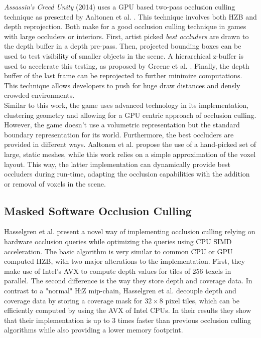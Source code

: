 \noindent
\emph{Assassin's Creed Unity} (2014) uses a \ac{GPU} based two-pass occlusion culling technique as presented by 
Aaltonen et al. \cite{Aaltonen2015}. This technique involves both \ac{HZB} and depth reprojection. Both make for 
a good occlusion culling technique in games with large occluders or interiors. First, artist picked 
\emph{best occluders} are drawn to the depth buffer in a depth pre-pass. Then, projected bounding boxes can be 
used to test visibility of smaller objects in the scene. A hierarchical z-buffer is used to accelerate this testing,
as proposed by Greene et al. \cite{Greene93,Greene95}. Finally, the depth buffer of the last frame can be 
reprojected to further minimize computations. This technique allows developers to push for huge draw distances and 
densly crowded environments.\\

\noindent
Similar to this work, the game uses advanced technology in its implementation, clustering geometry and allowing 
for a \ac{GPU} centric approach of occlusion culling. However, the game doesn't use a volumetric representation 
but the standard boundary representation for its world. Furthermore, the best occluders are provided in different 
ways. Aaltonen et al. \cite{Aaltonen2015} propose the use of a hand-picked set of large, static meshes, while this 
work relies on a simple approximation of the voxel layout. This way, the latter implementation can dynamically 
provide best occluders during run-time, adapting the occlusion capabilities with the addition or removal of voxels 
in the scene.


\subsection*{Masked Software Occlusion Culling}

Hasselgren et al. \cite{Hasselgren2016} present a novel way of implementing occlusion culling relying on hardware 
occlusion queries while optimizing the queries using \ac{CPU} \ac{SIMD} acceleration. The basic algorithm is very 
similar to common \ac{CPU} or \ac{GPU} computed \ac{HZB}, with two major alterations to the implementation. First, 
they make use of Intel's \ac{AVX} to compute depth values for tiles of 256 texels in parallel. The second difference 
is the way they store depth and coverage data. In contrast to a "normal" \ac{HiZ} mip-chain, Hasselgren et al. 
decouple depth and coverage data by storing a coverage mask for \begin{math}32 \times 8\end{math} pixel tiles, 
which can be efficiently computed by using the \ac{AVX} of Intel \ac{CPU}s. In their results they show that their 
implementation is up to 3 times faster than previous occlusion culling algorithms while also providing a lower 
memory footprint. \\

